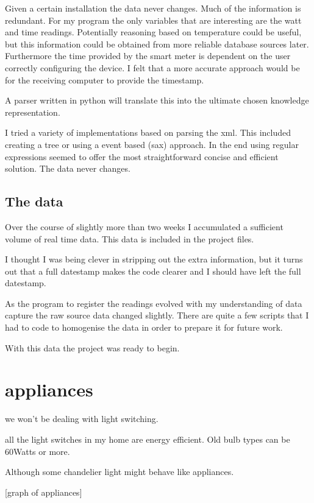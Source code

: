 Given a certain installation the data never changes. Much of the information is redundant. For my program the only variables that are interesting are the watt and time readings. Potentially reasoning based on temperature could be useful, but this information could be obtained from more reliable database sources later. Furthermore the time provided by the smart meter is dependent on the user correctly configuring the device. I felt that a more accurate approach would be for the receiving computer to provide the timestamp.

A parser written in python will translate this into the ultimate chosen knowledge representation. 

I tried a variety of implementations based on parsing the xml. This included creating a tree or using a event based (sax) approach. In the end using regular expressions seemed to offer the most straightforward concise and efficient solution. The data never changes.

\subsection{The data}

Over the course of slightly more than two weeks I accumulated a sufficient volume of real time data. This data is included in the project files.

I thought I was being clever in stripping out the extra information, but it turns out that a full datestamp makes the code clearer and I should have left the full datestamp.

As the program to register the readings evolved with my understanding of data capture the raw source data changed slightly. There are quite a few scripts that I had to code to homogenise the data in order to prepare it for future work.

With this data the project was ready to begin.


\section{appliances}

we won't be dealing with light switching.

all the light switches in my home are energy efficient. Old bulb types can be 60Watts or more.

Although some chandelier light might behave like appliances.

[graph of appliances]